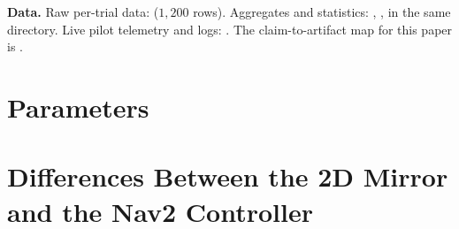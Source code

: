 \noindent\textbf{Data.} Raw per-trial data:  ($1{,}200$ rows). Aggregates and statistics: , ,  in the same directory. Live pilot telemetry and logs: . The claim-to-artifact map for this paper is .

\section{Parameters}\label{app:params}



\section{Differences Between the 2D Mirror and the Nav2 Controller}\label{app:mirror}

